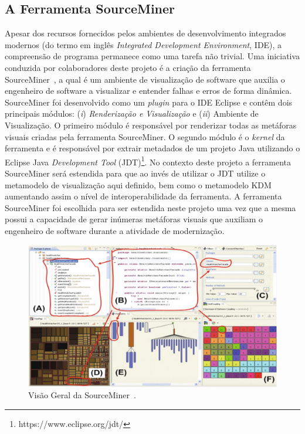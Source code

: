 \documentclass[12pt]{article}
\begin{document}
\subsection{A Ferramenta SourceMiner}\label{sec:source_miner}

Apesar dos recursos fornecidos pelos ambientes de desenvolvimento integrados modernos (do termo em inglês \textit{Integrated Development Environment}, IDE), a compreensão de programa permanece como uma tarefa não trivial. Uma iniciativa conduzida por colaboradores deste projeto é a criação da ferramenta SourceMiner~\cite{source_miner_glauco}, a qual é um ambiente de visualização de software que auxilia o engenheiro de software a visualizar e entender falhas e erros de forma dinâmica. SourceMiner foi desenvolvido como um \textit{plugin} para o IDE Eclipse e contêm dois principais módulos: (\textit{i}) \textit{Renderização e Visualização} e (\textit{ii}) Ambiente de Visualização. O primeiro módulo é responsável por renderizar todas as metáforas visuais criadas pela ferramenta SourceMiner. O segundo módulo é o \textit{kernel} da ferramenta e é responsável por extrair metadados de um projeto Java utilizando o Eclipse Java \textit{Development Tool} (JDT)\footnote{https://www.eclipse.org/jdt/}. No contexto deste projeto a ferramenta SourceMiner será estendida para que ao invés de utilizar o JDT utilize o metamodelo de visualização aqui definido, bem como o metamodelo KDM aumentando assim o nível de interoperabilidade da ferramenta. A ferramenta SourceMiner foi escolhida para ser estendida neste projeto uma vez que a mesma possui a capacidade de gerar inúmeras metáforas visuais que auxiliam o engenheiro de software durante a atividade de modernização.  

\begin{figure}[h]
 \centering
 \includegraphics[scale=0.4]{sourceminerScreen.png}
 \caption{Visão Geral da SourceMiner~\cite{source_miner_glauco}.}
 \label{fig:source_miner_tool}
\end{figure}
\end{document}
